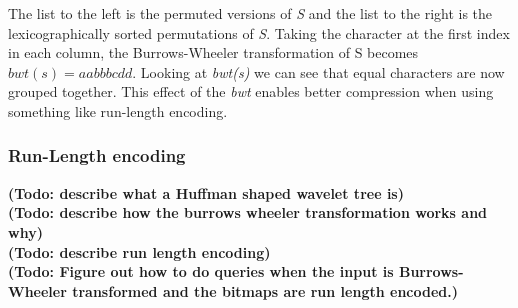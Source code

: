 The list to the left is the permuted versions of \textit{S} and the list to the right is the lexicographically sorted permutations of \textit{S}.
Taking the character at the first index in each column, the Burrows-Wheeler transformation of S becomes $bwt(s) = aabbbcdd$.
Looking at \textit{bwt(s)} we can see that equal characters are now grouped together.
This effect of the \textit{bwt} enables better compression when using something like run-length encoding.

\subsubsection{Run-Length encoding}


\noindent\textbf{(Todo: describe what a Huffman shaped wavelet tree is)}\\
\textbf{(Todo: describe how the burrows wheeler transformation works and why)} \\
\textbf{(Todo: describe run length encoding)} \\
\textbf{(Todo: Figure out how to do queries when the input is Burrows-Wheeler transformed and the bitmaps are run length encoded.)}





